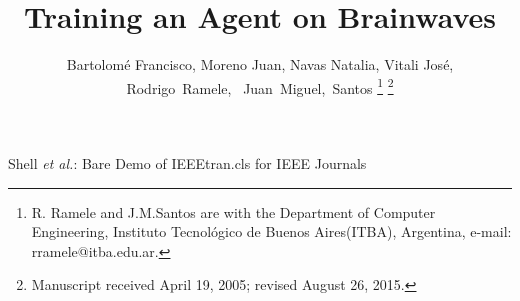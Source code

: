 \documentclass[journal]{IEEEtran}
\begin{document}
%
\title{Training an Agent on Brainwaves}
%
%
%

\author{Bartolomé Francisco, Moreno Juan,  Navas Natalia, Vitali José, \\
Rodrigo~Ramele,~ 
        Juan~Miguel,~Santos%
\thanks{R. Ramele and J.M.Santos are with the Department
of Computer Engineering, Instituto Tecnológico de Buenos Aires(ITBA), Argentina,
e-mail: rramele@itba.edu.ar.}%
\thanks{Manuscript received April 19, 2005; revised August 26, 2015.}}

% 
%



%
{Shell \MakeLowercase{\textit{et al.}}: Bare Demo of IEEEtran.cls for IEEE Journals}
% 
\end{document}
